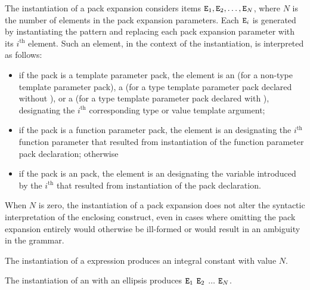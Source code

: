 \pnum
The instantiation of a pack expansion considers
items $\texttt{\protect E}_1, \texttt{\protect E}_2, \dotsc, \texttt{\protect E}_N$,
where
$N$ is the number of elements in the pack expansion parameters.
Each $\texttt{\protect E}_i$ is generated by instantiating the pattern and
replacing each pack expansion parameter with its $i^\text{th}$ element.
Such an element, in the context of the instantiation, is interpreted as
follows:
\begin{itemize}
\item
if the pack is a template parameter pack, the element is
an 
(for a non-type template parameter pack),
a 
(for a type template parameter pack declared without ), or
a 
(for a type template parameter pack declared with ),
designating the $i^\text{th}$ corresponding type or value template argument;

\item
if the pack is a function parameter pack, the element is an
designating the $i^\text{th}$ function parameter
that resulted from instantiation of
the function parameter pack declaration;
otherwise

\item
if the pack is an  pack,
the element is an 
designating the variable introduced by
the $i^\text{th}$ 
that resulted from instantiation of
the  pack declaration.
\end{itemize}
When $N$ is zero, the instantiation of a pack expansion
does not alter the syntactic interpretation of the enclosing construct,
even in cases where omitting the pack expansion entirely would
otherwise be ill-formed or would result in an ambiguity in the grammar.

\pnum
The instantiation of a  expression produces
an integral constant with value $N$.

\pnum
The instantiation of an  with an ellipsis
produces $\texttt{\protect E}_1$ $\texttt{\protect E}_2$ $\dotsc$ $\texttt{\protect E}_N$.

